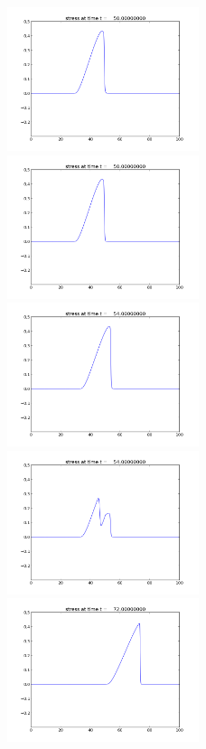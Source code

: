 \documentclass{article}
\begin{document}
\begin{figure}
  \includegraphics[width=0.5\textwidth]{homo1.png}
  \includegraphics[width=0.5\textwidth]{reflect1.png}
  \includegraphics[width=0.5\textwidth]{homo2.png}
  \includegraphics[width=0.5\textwidth]{reflect2.png}
  \includegraphics[width=0.5\textwidth]{homo3.png}

\end{figure}
\end{document}
